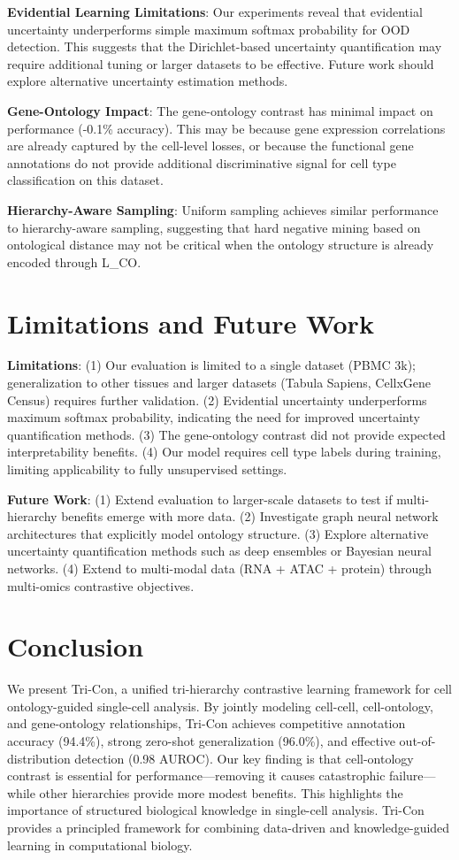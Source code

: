 \documentclass[11pt]{article}
\begin{document}
\textbf{Evidential Learning Limitations}: Our experiments reveal that evidential uncertainty underperforms simple maximum softmax probability for OOD detection. This suggests that the Dirichlet-based uncertainty quantification may require additional tuning or larger datasets to be effective. Future work should explore alternative uncertainty estimation methods.

\textbf{Gene-Ontology Impact}: The gene-ontology contrast has minimal impact on performance (-0.1\% accuracy). This may be because gene expression correlations are already captured by the cell-level losses, or because the functional gene annotations do not provide additional discriminative signal for cell type classification on this dataset.

\textbf{Hierarchy-Aware Sampling}: Uniform sampling achieves similar performance to hierarchy-aware sampling, suggesting that hard negative mining based on ontological distance may not be critical when the ontology structure is already encoded through L\_CO.

\section{Limitations and Future Work}

\textbf{Limitations}: (1) Our evaluation is limited to a single dataset (PBMC 3k); generalization to other tissues and larger datasets (Tabula Sapiens, CellxGene Census) requires further validation. (2) Evidential uncertainty underperforms maximum softmax probability, indicating the need for improved uncertainty quantification methods. (3) The gene-ontology contrast did not provide expected interpretability benefits. (4) Our model requires cell type labels during training, limiting applicability to fully unsupervised settings.

\textbf{Future Work}: (1) Extend evaluation to larger-scale datasets to test if multi-hierarchy benefits emerge with more data. (2) Investigate graph neural network architectures that explicitly model ontology structure. (3) Explore alternative uncertainty quantification methods such as deep ensembles or Bayesian neural networks. (4) Extend to multi-modal data (RNA + ATAC + protein) through multi-omics contrastive objectives.

\section{Conclusion}

We present Tri-Con, a unified tri-hierarchy contrastive learning framework for cell ontology-guided single-cell analysis. By jointly modeling cell-cell, cell-ontology, and gene-ontology relationships, Tri-Con achieves competitive annotation accuracy (94.4\%), strong zero-shot generalization (96.0\%), and effective out-of-distribution detection (0.98 AUROC). Our key finding is that cell-ontology contrast is essential for performance---removing it causes catastrophic failure---while other hierarchies provide more modest benefits. This highlights the importance of structured biological knowledge in single-cell analysis. Tri-Con provides a principled framework for combining data-driven and knowledge-guided learning in computational biology.
\end{document}
